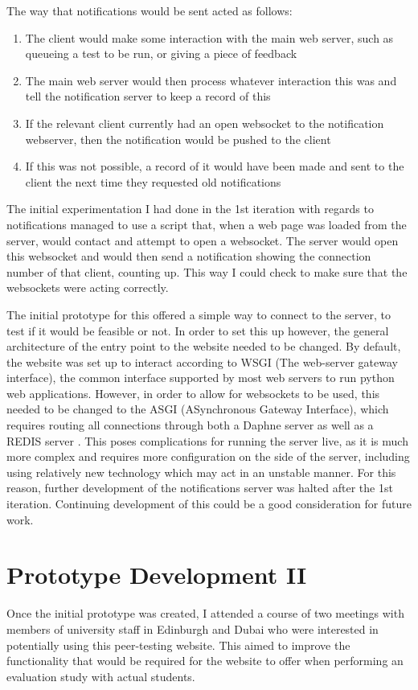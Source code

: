 \documentclass[a4paper,11pt]{report}
\begin{document}
The way that notifications would be sent acted as follows:
\begin{enumerate}
\item The client would make some interaction with the main web server, such as queueing a test to be run, or giving a piece of feedback
\item The main web server would then process whatever interaction this was and tell the notification server to keep a record of this
\item If the relevant client currently had an open websocket to the notification webserver, then the notification would be pushed to the client
\item If this was not possible, a record of it would have been made and sent to the client the next time they requested old notifications
\end{enumerate}
The initial experimentation I had done in the 1st iteration with regards to notifications managed to use a script that, when a web page was loaded from the server, would contact and attempt to open a websocket. The server would open this websocket and would then send a notification showing the connection number of that client, counting up. This way I could check to make sure that the websockets were acting correctly.\par
The initial prototype for this offered a simple way to connect to the server, to test if it would be feasible or not. In order to set this up however, the general architecture of the entry point to the website needed to be changed. By default, the website was set up to interact according to WSGI (The web-server gateway interface), the common interface supported by most web servers to run python web applications\cite{python_software_foundation_pep_2010}. However, in order to allow for websockets to be used, this needed to be changed to the ASGI (ASynchronous Gateway Interface), which requires routing all connections through both a Daphne server as well as a REDIS server \cite{django_channels_2016}. This poses complications for running the server live, as it is much more complex and requires more configuration on the side of the server, including using relatively new technology which may act in an unstable manner. For this reason, further development of the notifications server was halted after the 1st iteration. Continuing development of this could be a good consideration for future work.


\chapter{Prototype Development II}
\label{ch:proto2}
Once the initial prototype was created, I attended a course of two meetings with members of university staff in Edinburgh and Dubai who were interested in potentially using this peer-testing website. This aimed to improve the functionality that would be required for the website to offer when performing an evaluation study with actual students.\par
\end{document}
